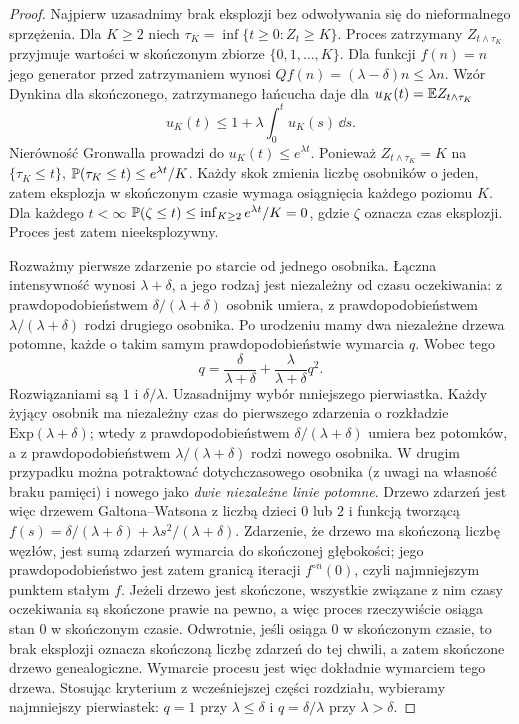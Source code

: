 \begin{proof}
Najpierw uzasadnimy brak eksplozji bez odwoływania się do
nieformalnego sprzężenia. Dla $K\ge2$ niech
$\tau_K=\inf\{t\ge0:Z_t\ge K\}$. Proces zatrzymany
$Z_{t\wedge\tau_K}$ przyjmuje wartości w skończonym
zbiorze $\{0,1,\ldots,K\}$. Dla funkcji $f(n)=n$
jego generator przed zatrzymaniem wynosi
$Qf(n)=(\lambda-\delta)n\le\lambda n$.
Wzór Dynkina dla skończonego, zatrzymanego łańcucha
daje dla $u_K(t)=\mathbb{E} Z_{t\wedge\tau_K}$
\[
u_K(t)\le1+\lambda\int_0^tu_K(s)\,\dd s.
\]
Nierówność Gronwalla prowadzi do
$u_K(t)\le e^{\lambda t}$. Ponieważ
$Z_{t\wedge\tau_K}=K$ na $\{\tau_K\le t\}$,
$\mathbb{P}(\tau_K\le t)\le e^{\lambda t}/K$.
Każdy skok zmienia liczbę osobników o jeden, zatem
eksplozja w skończonym czasie wymaga osiągnięcia
każdego poziomu $K$. Dla każdego $t<\infty$
$\mathbb{P}(\zeta\le t)\le\inf_{K\ge2}e^{\lambda t}/K=0$,
gdzie $\zeta$ oznacza czas eksplozji. Proces jest zatem
nieeksplozywny.

Rozważmy pierwsze zdarzenie po starcie od jednego osobnika.
Łączna intensywność wynosi $\lambda+\delta$, a jego rodzaj
jest niezależny od czasu oczekiwania: z prawdopodobieństwem
$\delta/(\lambda+\delta)$ osobnik umiera, z prawdopodobieństwem
$\lambda/(\lambda+\delta)$ rodzi drugiego osobnika.
Po urodzeniu mamy dwa niezależne drzewa potomne, każde
o takim samym prawdopodobieństwie wymarcia $q$.
Wobec tego
\[
q=\frac{\delta}{\lambda+\delta}
+\frac{\lambda}{\lambda+\delta}q^2.
\]
Rozwiązaniami są $1$ i $\delta/\lambda$.
Uzasadnijmy wybór mniejszego pierwiastka. Każdy żyjący
osobnik ma niezależny czas do pierwszego zdarzenia
o rozkładzie $\mathrm{Exp}(\lambda+\delta)$; wtedy
z prawdopodobieństwem $\delta/(\lambda+\delta)$
umiera bez potomków, a z prawdopodobieństwem
$\lambda/(\lambda+\delta)$ rodzi nowego osobnika.
W drugim przypadku można potraktować dotychczasowego
osobnika (z uwagi na własność braku pamięci) i nowego
jako \emph{dwie niezależne linie potomne}. Drzewo
zdarzeń jest więc drzewem Galtona--Watsona z liczbą
dzieci $0$ lub $2$ i funkcją tworzącą
$f(s)=\delta/(\lambda+\delta)+\lambda s^2/(\lambda+\delta)$.
Zdarzenie, że drzewo ma skończoną liczbę węzłów,
jest sumą zdarzeń wymarcia do skończonej głębokości;
jego prawdopodobieństwo jest zatem granicą iteracji
$f^{\circ n}(0)$, czyli najmniejszym punktem stałym $f$.
Jeżeli drzewo jest skończone, wszystkie związane z nim
czasy oczekiwania są skończone prawie na pewno,
a więc proces rzeczywiście osiąga stan $0$ w skończonym
czasie. Odwrotnie, jeśli osiąga $0$ w skończonym czasie,
to brak eksplozji oznacza skończoną liczbę zdarzeń do tej
chwili, a zatem skończone drzewo genealogiczne.
Wymarcie procesu jest więc dokładnie wymarciem tego drzewa.
Stosując kryterium z wcześniejszej części rozdziału,
wybieramy najmniejszy pierwiastek: $q=1$ przy
$\lambda\le\delta$ i $q=\delta/\lambda$ przy
$\lambda>\delta$.
\end{proof}

